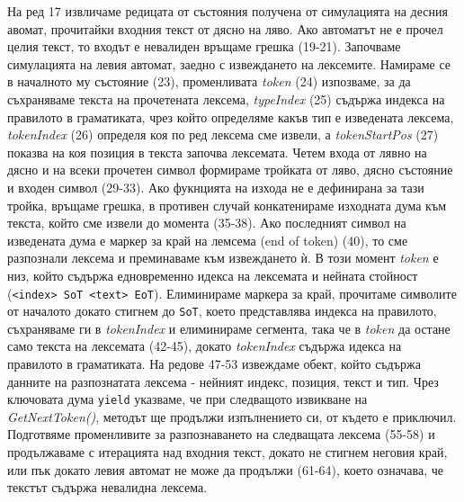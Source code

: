 \documentclass[12pt, oneside]{article}
\theoremstyle{definition}
\begin{document}
На ред 17 извличаме редицата от състояния получена от симулацията на десния авомат, прочитайки входния текст от дясно на ляво. Ако автоматът не е прочел целия текст, то входът е невалиден връщаме грешка (19-21). Започваме симулацията на левия автомат, заедно с извеждането на лексемите. Намираме се в началното му състояние (23), променливата \emph{token} (24) изпозваме, за да съхраняваме текста на прочетената лексема, \emph{typeIndex} (25) съдържа индекса на правилото в граматиката, чрез който определяме какъв тип е изведената лексема, \emph{tokenIndex} (26) определя коя по ред лексема сме извели, а \emph{tokenStartPos} (27) показва на коя позиция в текста започва лексемата. Четем входа от лявно на дясно и на всеки прочетен символ формираме тройката от ляво, дясно състояние и входен символ (29-33). Ако фукнцията на изхода не е дефинирана за тази тройка, връщаме грешка, в противен случай конкатенираме изходната дума към текста, който сме извели до момента (35-38). Ако последният символ на изведената дума е маркер за край на лемсема (end of token) (40), то сме разпознали лексема и преминаваме към извеждането ѝ. В този момент \emph{token} е низ, който съдържа едновременно идекса на лексемата и нейната стойност (\verb/<index> SoT <text> EoT/). Елиминираме маркера за край, прочитаме символите от началото докато стигнем до \verb/SoT/, което представлява индекса на правилото, съхраняваме ги в \emph{tokenIndex} и елиминираме сегмента, така че в \emph{token} да остане само текста на лексемата (42-45), докато \emph{tokenIndex} съдържа идекса на правилото в граматиката.  На редове 47-53 извеждаме обект, който съдържа данните на разпознатата лексема - нейният индекс, позиция, текст и тип. Чрез ключовата дума \verb/yield/ указваме, че при следващото извикване на \emph{GetNextToken()}, методът ще продължи изпълнението си, от където е приключил. Подготвяме променливите за разпознаването на следващата лексема (55-58) и продължаваме с итерацията над входния текст, докато не стигнем неговия край, или пък докато левия автомат не може да продължи (61-64), което означава, че текстът съдържа невалидна лексема.
\end{document}
